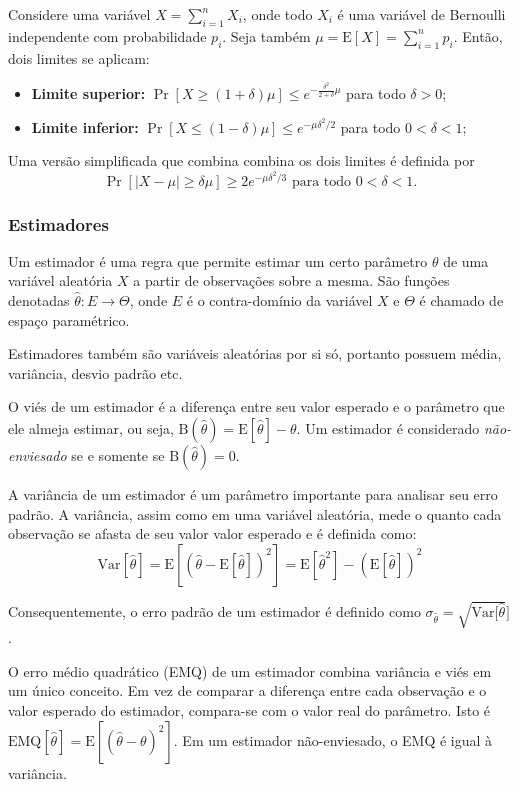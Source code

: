 Considere uma variável $X = \sum_{i=1}^n X_i$, onde todo $X_i$ é uma variável de Bernoulli independente com probabilidade $p_i$. Seja também $\mu = \text{E}[X] = \sum_{i=1}^n p_i$. Então, dois limites se aplicam:

\begin{itemize}
  \item \textbf{Limite superior:} $\Pr[X \geq (1 + \delta)\mu] \leq e^{-\frac{\delta^2}{2+\delta}\mu}$ para todo $\delta > 0$;
  \item \textbf{Limite inferior:} $\Pr[X \leq (1 - \delta)\mu] \leq e^{-\mu\delta^2/2}$ para todo $0 < \delta < 1$;
\end{itemize}

Uma versão simplificada que combina combina os dois limites é definida por
\[
    \Pr[|X - \mu| \geq \delta\mu] \geq 2e^{-\mu\delta^2/3}\text{ para todo } 0 < \delta < 1.
\]

\subsubsection{Estimadores}

Um estimador é uma regra que permite estimar um certo parâmetro $\theta$ de uma variável aleatória $X$ a partir de observações sobre a mesma. São funções denotadas $\hat{\theta} : E \to \Theta$, onde $E$ é o contra-domínio da variável $X$ e $\Theta$ é chamado de espaço paramétrico.

Estimadores também são variáveis aleatórias por si só, portanto possuem média, variância, desvio padrão etc.

O viés de um estimador é a diferença entre seu valor esperado e o parâmetro que ele almeja estimar, ou seja, $\text{B}(\hat{\theta}) = \text{E}[\hat{\theta}] - \theta$. Um estimador é considerado \emph{não-enviesado} se e somente se $\text{B}(\hat{\theta}) = 0$.

A variância de um estimador é um parâmetro importante para analisar seu erro padrão. A variância, assim como em uma variável aleatória, mede o quanto cada observação se afasta de seu valor valor esperado e é definida como:
\[
    \text{Var}[\hat{\theta}] = \text{E}[(\hat{\theta} - \text{E}[\hat{\theta}])^2] = \text{E}[\hat{\theta}^2] - (\text{E}[\hat{\theta}])^2
\]

Consequentemente, o erro padrão de um estimador é definido como $\sigma_{\hat{\theta}} = \sqrt{\text{Var}[\hat{\theta}}]$.

O erro médio quadrático (EMQ) de um estimador combina variância e viés em um único conceito. Em vez de comparar a diferença entre cada observação e o valor esperado do estimador, compara-se com o valor real do parâmetro. Isto é $\text{EMQ}[\hat{\theta}] = \text{E}[(\hat{\theta} - \theta)^2]$. Em um estimador não-enviesado, o EMQ é igual à variância.

